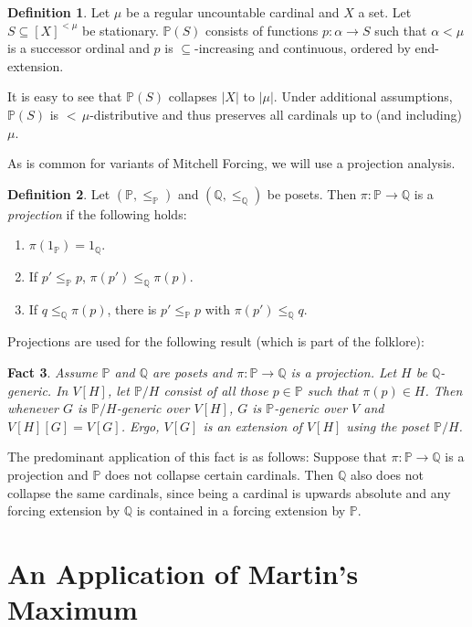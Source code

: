 \documentclass[a4paper]{amsart}
\theoremstyle{definition}
\newtheorem{mydef}{Definition}[section]
\theoremstyle{remark}
\theoremstyle{plain}
\newtheorem{myfact}[mydef]{Fact}
\numberwithin{mydef}{section}
\newcommand{\dP}{\mathbb{P}}
\newcommand{\dQ}{\mathbb{Q}}
\begin{document}
	\begin{mydef}
		Let $\mu$ be a regular uncountable cardinal and $X$ a set. Let $S\subseteq[X]^{<\mu}$ be stationary. $\dP(S)$ consists of functions $p\colon\alpha\to S$ such that $\alpha<\mu$ is a successor ordinal and $p$ is $\subseteq$-increasing and continuous, ordered by end-extension.
	\end{mydef}
	
	It is easy to see that $\dP(S)$ collapses $|X|$ to $|\mu|$. Under additional assumptions, $\dP(S)$ is ${<}\,\mu$-distributive and thus preserves all cardinals up to (and including) $\mu$.
	
	As is common for variants of Mitchell Forcing, we will use a projection analysis.
	
	\begin{mydef}
		Let $(\dP,\leq_{\dP})$ and $(\dQ,\leq_{\dQ})$ be posets. Then $\pi\colon\dP\to\dQ$ is a \emph{projection} if the following holds:
		\begin{enumerate}
			\item $\pi(1_{\dP})=1_{\dQ}$.
			\item If $p'\leq_{\dP} p$, $\pi(p')\leq_{\dQ}\pi(p)$.
			\item If $q\leq_{\dQ}\pi(p)$, there is $p'\leq_{\dP} p$ with $\pi(p')\leq_{\dQ} q$.
		\end{enumerate}
	\end{mydef}
	
	Projections are used for the following result (which is part of the folklore):
	
	\begin{myfact}\label{FactProjection}
		Assume $\dP$ and $\dQ$ are posets and $\pi\colon\dP\to\dQ$ is a projection. Let $H$ be $\dQ$-generic. In $V[H]$, let $\dP/H$ consist of all those $p\in\dP$ such that $\pi(p)\in H$. Then whenever $G$ is $\dP/H$-generic over $V[H]$, $G$ is $\dP$-generic over $V$ and $V[H][G]=V[G]$. Ergo, $V[G]$ is an extension of $V[H]$ using the poset $\dP/H$.
	\end{myfact}
	
	The predominant application of this fact is as follows: Suppose that $\pi\colon\dP\to\dQ$ is a projection and $\dP$ does not collapse certain cardinals. Then $\dQ$ also does not collapse the same cardinals, since being a cardinal is upwards absolute and any forcing extension by $\dQ$ is contained in a forcing extension by $\dP$.
	
	\section{An Application of Martin's Maximum}
	
\end{document}
